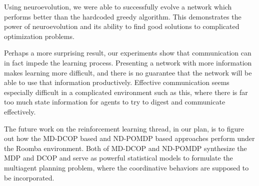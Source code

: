 \documentclass[conference]{IEEEtran}
\begin{document}
Using neuroevolution, we were able to successfully evolve a network which performs better than the hardcoded greedy algorithm. This demonstrates the power of neuroevolution and its ability to find good solutions to complicated optimization problems.

Perhaps a more surprising result, our experiments show that communication can in fact impede the learning process. Presenting a network with more information makes learning more difficult, and there is no guarantee that the network will be able to use that information productively. Effective communication seems especially difficult in a complicated environment such as this, where there is far too much state information for agents to try to digest and communicate effectively.

The future work on the reinforcement learning thread, in our plan, is to
figure out how the MD-DCOP based and ND-POMDP based approaches perform under
the Roomba environment. 
Both of MD-DCOP and ND-POMDP synthesize the MDP and DCOP and serve as powerful
statistical models to formulate the multiagent planning problem, where the
coordinative behaviors are supposed to be incorporated. 



\newpage








\end{document}

